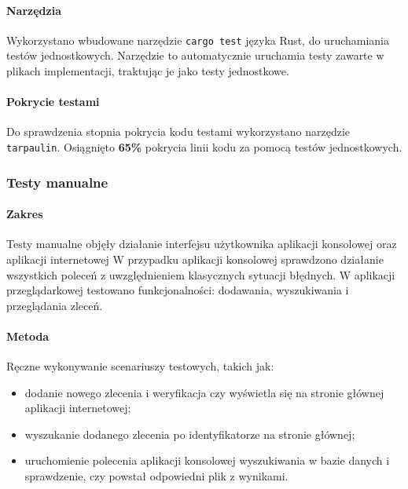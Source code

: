             \paragraph{Narzędzia}  
            Wykorzystano wbudowane narzędzie \texttt{cargo test} języka Rust, do uruchamiania testów jednostkowych. Narzędzie to automatycznie uruchamia testy zawarte w plikach implementacji, traktując je jako testy jednostkowe.

            \paragraph{Pokrycie testami}
            Do sprawdzenia stopnia pokrycia kodu testami wykorzystano narzędzie \texttt{tarpaulin}\cite{Rust:tarpaulin}. 
            Osiągnięto \textbf{65\%} pokrycia linii kodu za pomocą testów jednostkowych.

        \subsubsection{Testy manualne}
        
            \paragraph{Zakres}
            Testy manualne objęły działanie interfejsu użytkownika aplikacji konsolowej oraz aplikacji internetowej W przypadku aplikacji konsolowej sprawdzono działanie wszystkich poleceń z uwzględnieniem klasycznych sytuacji błędnych. W aplikacji przeglądarkowej testowano funkcjonalności: dodawania, wyszukiwania i przeglądania zleceń.

            \paragraph{Metoda}
            Ręczne wykonywanie scenariuszy testowych, takich jak:
            \begin{itemize}
                \item {dodanie nowego zlecenia i weryfikacja czy wyświetla się na stronie głównej aplikacji internetowej;}
                \item {wyszukanie dodanego zlecenia po identyfikatorze na stronie głównej;}
                \item {uruchomienie polecenia aplikacji konsolowej wyszukiwania w bazie danych i sprawdzenie, czy powstał odpowiedni plik z wynikami.}
            \end{itemize}
